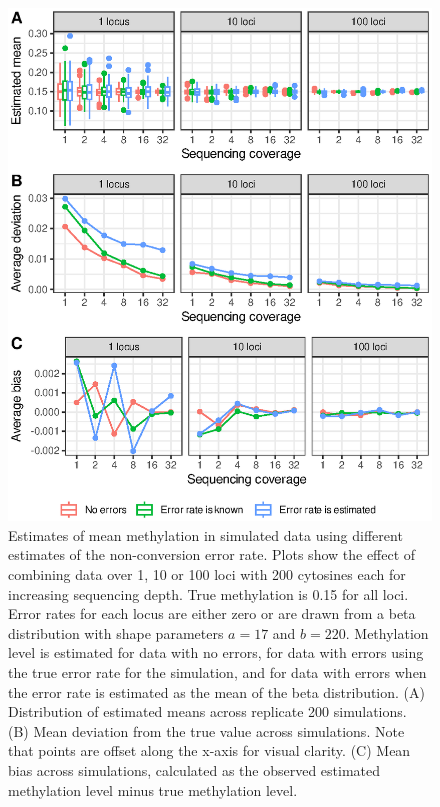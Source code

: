 \documentclass[10pt,letterpaper]{article}
\begin{document}
\begin{figure}
  \begin{center}
    \includegraphics{figure3.eps}
    \caption{
        Estimates of mean methylation in simulated data using different estimates of the non-conversion error rate.
        Plots show the effect of combining data over 1, 10 or 100 loci with 200 cytosines each for increasing sequencing depth.
        True methylation is 0.15 for all loci.
        Error rates for each locus are either zero or are drawn from a beta distribution with shape parameters $a=17$ and $b=220$.
        Methylation level is estimated for data with no errors, for data with errors using the true error rate for the simulation, and for data with errors when the error rate is estimated as the mean of the beta distribution.
        (A) Distribution of estimated means across replicate 200 simulations.
        (B) Mean deviation from the true value across simulations.
        Note that points are offset along the x-axis for visual clarity.
        (C) Mean bias across simulations, calculated as the observed estimated methylation level minus true methylation level.
    }
    \label{fig:simulations}
  \end{center}
\end{figure}
\end{document}
